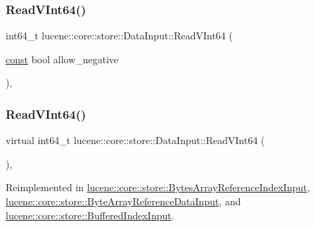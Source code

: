 \mbox{\label{classlucene_1_1core_1_1store_1_1DataInput_abdf472f02e6391e659b94f01776bc2b5}} 
\subsubsection{\texorpdfstring{Read\+V\+Int64()}{ReadVInt64()}\hspace{0.1cm}{\footnotesize\ttfamily [1/2]}}
{\footnotesize\ttfamily int64\+\_\+t lucene\+::core\+::store\+::\+Data\+Input\+::\+Read\+V\+Int64 (\begin{DoxyParamCaption}\item[{\mbox{\hyperlink{ZlibCrc32_8h_a2c212835823e3c54a8ab6d95c652660e}{const}} bool}]{allow\+\_\+negative }\end{DoxyParamCaption})\hspace{0.3cm}{\ttfamily [inline]}, {\ttfamily [private]}}

\mbox{\label{classlucene_1_1core_1_1store_1_1DataInput_a71781c16e8c3ebf21dcafb37cee5bcc6}} 
\subsubsection{\texorpdfstring{Read\+V\+Int64()}{ReadVInt64()}\hspace{0.1cm}{\footnotesize\ttfamily [2/2]}}
{\footnotesize\ttfamily virtual int64\+\_\+t lucene\+::core\+::store\+::\+Data\+Input\+::\+Read\+V\+Int64 (\begin{DoxyParamCaption}{ }\end{DoxyParamCaption})\hspace{0.3cm}{\ttfamily [inline]}, {\ttfamily [virtual]}}



Reimplemented in \mbox{\hyperlink{classlucene_1_1core_1_1store_1_1BytesArrayReferenceIndexInput_a90480274a6aae4a6eca547d0316d0f28}{lucene\+::core\+::store\+::\+Bytes\+Array\+Reference\+Index\+Input}}, \mbox{\hyperlink{classlucene_1_1core_1_1store_1_1ByteArrayReferenceDataInput_a607628859721dc59ff3d92bcf740dbf1}{lucene\+::core\+::store\+::\+Byte\+Array\+Reference\+Data\+Input}}, and \mbox{\hyperlink{classlucene_1_1core_1_1store_1_1BufferedIndexInput_a34e0b8db80c8efdc4bd34f6326be9c64}{lucene\+::core\+::store\+::\+Buffered\+Index\+Input}}.

